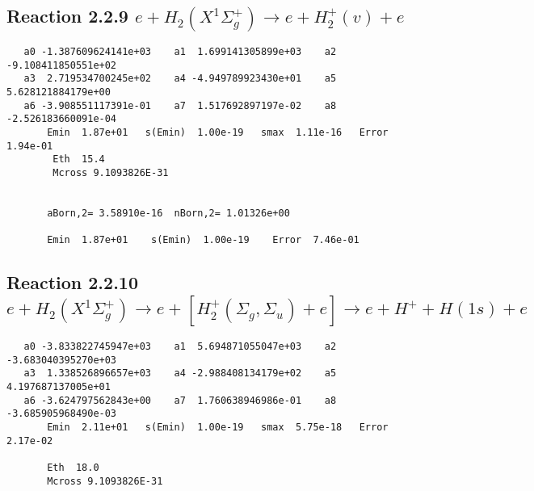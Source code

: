 \documentclass[12pt,dvipdfm]{article}
\begin{document}
\newpage
\subsection{
Reaction 2.2.9 $e + H_2(X^1\Sigma_g^+) \rightarrow e + H_2^+(v) + e$}
















\begin{small}\begin{verbatim}
   a0 -1.387609624141e+03    a1  1.699141305899e+03    a2 -9.108411850551e+02
   a3  2.719534700245e+02    a4 -4.949789923430e+01    a5  5.628121884179e+00
   a6 -3.908551117391e-01    a7  1.517692897197e-02    a8 -2.526183660091e-04
       Emin  1.87e+01   s(Emin)  1.00e-19   smax  1.11e-16   Error  1.94e-01
        Eth  15.4
        Mcross 9.1093826E-31


       aBorn,2= 3.58910e-16  nBorn,2= 1.01326e+00

       Emin  1.87e+01    s(Emin)  1.00e-19    Error  7.46e-01

\end{verbatim}\end{small}




\newpage
\subsection{
Reaction 2.2.10 $e + H_2(X^1\Sigma_g^+) \rightarrow e + [H_2^+(\Sigma_g, \Sigma_u) + e] \rightarrow e + H^+ + H(1s) + e$}
















\begin{small}\begin{verbatim}
   a0 -3.833822745947e+03    a1  5.694871055047e+03    a2 -3.683040395270e+03
   a3  1.338526896657e+03    a4 -2.988408134179e+02    a5  4.197687137005e+01
   a6 -3.624797562843e+00    a7  1.760638946986e-01    a8 -3.685905968490e-03
       Emin  2.11e+01   s(Emin)  1.00e-19   smax  5.75e-18   Error  2.17e-02

       Eth  18.0
       Mcross 9.1093826E-31
\end{verbatim}\end{small}
\end{document}
